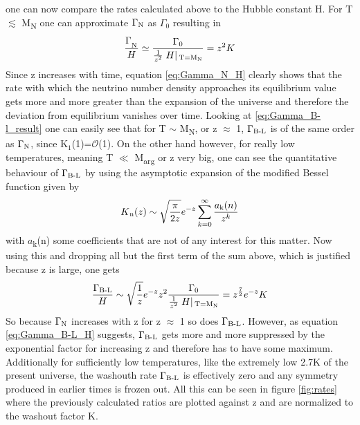 one can now compare the rates calculated above to the Hubble constant H.\newline
For T $\lesssim$ M\textsubscript{N} one can approximate $\Gamma\textsubscript{N}$ as $\Gamma_0$ resulting in 
\begin{equation}
	\frac{\Gamma_\textsubscript{N}}{H}\simeq\frac{\Gamma_0}{\frac{1}{z^2}\left.H\right|\textsubscript{T=M\textsubscript{N}}}=z^2K
	\label{eq:Gamma_N_H}
\end{equation}
Since z increases with time, equation \eqref{eq:Gamma_N_H} clearly shows that the rate with which the neutrino number density approaches its equilibrium value gets more and more greater than the expansion of the universe and therefore the deviation from equilibrium vanishes over time. \newline
Looking at \eqref{eq:Gamma_B-l_result} one can easily see that for T $\sim$ M\textsubscript{N}, or z $\approx$ 1, $\Gamma\textsubscript{B-L}$ is of the same order as $\Gamma\textsubscript{N}$, since K$_1$(1)=$\mathcal{O}$(1). On the other hand however, for really low temperatures, meaning T $\ll$ M\textsubscript{arg} or z very big, one can see the quantitative behaviour of $\Gamma\textsubscript{B-L}$ by using the asymptotic expansion of the modified Bessel function given by
\begin{equation*}
	K\textsubscript{n}(z)\sim\sqrt{\frac{\pi}{2z}}e^{-z}\sum_{k=0}^{\infty}\frac{a\textsubscript{k}(n)}{z^k}
\end{equation*}
with $a$\textsubscript{k}(n) some coefficients that are not of any interest for this matter. Now using this and dropping all but the first term of the sum above, which is justified because z is large, one gets
\begin{equation}
	\frac{\Gamma\textsubscript{B-L}}{H}\sim\sqrt{\frac{1}{z}}e^{-z}z^2\frac{\Gamma_0}{\frac{1}{z^2}\left.H\right|\textsubscript{T=M\textsubscript{N}}}=z^\frac{7}{2}e^{-z}K
	\label{eq:Gamma_B-L_H}
\end{equation}
So because $\Gamma\textsubscript{N}$ increases with z for z $\approx$ 1 so does $\Gamma\textsubscript{B-L}$. However, as equation \eqref{eq:Gamma_B-L_H} suggests, $\Gamma\textsubscript{B-L}$ gets more and more suppressed by the exponential factor for increasing z and therefore has to have some maximum. Additionally for sufficiently low temperatures, like the extremely low 2.7K of the present universe, the washouth rate $\Gamma\textsubscript{B-L}$ is effectively zero and any symmetry produced in earlier times is frozen out. 
All this can be seen in figure \ref{fig:rates} where the previously calculated ratios are plotted against z and are normalized to the washout factor K.
